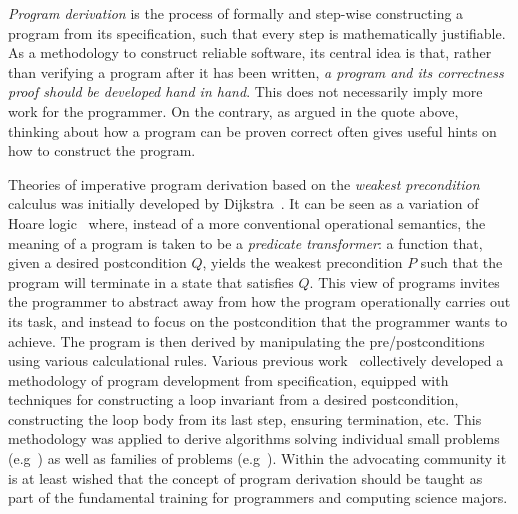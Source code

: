 \documentclass[runningheads]{llncs}
\begin{document}
\emph{Program derivation} is the process of formally and step-wise constructing a program from its specification, such that every step is mathematically justifiable. As a methodology to construct reliable software, its central idea is that, rather than verifying a program after it has been written, \emph{a program and its correctness proof should be developed hand in hand}.
This does not necessarily imply more work for the programmer.
On the contrary, as argued in the quote above, thinking about how a program can be proven correct often gives useful hints on how to construct the program.

Theories of imperative program derivation based on the \emph{weakest precondition} calculus was initially developed by Dijkstra~\cite{Dijkstra:75:Guarded}.
It can be seen as a variation of Hoare logic~\cite{Hoare:69:Axiomatic} where, instead of a more conventional operational semantics, the meaning of a program is taken to be a \emph{predicate transformer}: a function that, given a desired postcondition $Q$, yields the weakest precondition $P$ such that the program will terminate in a state that satisfies $Q$.
This view of programs invites the programmer to abstract away from how the program operationally carries out its task, and instead to focus on the postcondition that the programmer wants to achieve.
The program is then derived by manipulating the pre/postconditions using various calculational rules.
Various previous work~\cite{Dijkstra:76:Discipline,%
Gries:81:Science,Kaldewaij:90:Programming,Morgan:90:Programming,%
Backhouse:03:Program,Backhouse:11:Algorithmic} collectively developed a methodology of program development from specification, equipped with techniques for constructing a loop invariant from a desired postcondition, constructing the loop body from its last step, ensuring termination, etc.
This methodology was applied to derive algorithms
solving individual small problems
(e.g~\cite{Rem:89:Small,Rem:90:Small}) as well as families of problems (e.g~\cite{Zantema:92:Longest}).
Within the advocating community it is at least wished that the concept of program derivation should be taught as part of the fundamental training for programmers and computing science majors.
\end{document}
